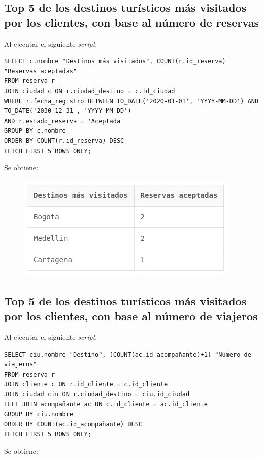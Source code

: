 \documentclass{article}
\begin{document}
\newpage


\subsection{Top 5 de los destinos turísticos más visitados por los clientes, con base al número de reservas}
Al ejecutar el siguiente \textit{script}:
\begin{lstlisting}
SELECT c.nombre "Destinos más visitados", COUNT(r.id_reserva) "Reservas aceptadas"
FROM reserva r
JOIN ciudad c ON r.ciudad_destino = c.id_ciudad
WHERE r.fecha_registro BETWEEN TO_DATE('2020-01-01', 'YYYY-MM-DD') AND TO_DATE('2030-12-31', 'YYYY-MM-DD')
AND r.estado_reserva = 'Aceptada'
GROUP BY c.nombre
ORDER BY COUNT(r.id_reserva) DESC
FETCH FIRST 5 ROWS ONLY;
\end{lstlisting}

Se obtiene:

\begin{figure}[H]
    \centering
    \includegraphics[width=0.75\linewidth]{img/Consulta_3.png}
\end{figure}


\newpage


\subsection{Top 5 de los destinos turísticos más visitados por los clientes, con base al número de viajeros}
Al ejecutar el siguiente \textit{script}:
\begin{lstlisting}
SELECT ciu.nombre "Destino", (COUNT(ac.id_acompañante)+1) "Número de viajeros"
FROM reserva r
JOIN cliente c ON r.id_cliente = c.id_cliente
JOIN ciudad ciu ON r.ciudad_destino = ciu.id_ciudad
LEFT JOIN acompañante ac ON c.id_cliente = ac.id_cliente
GROUP BY ciu.nombre
ORDER BY COUNT(ac.id_acompañante) DESC
FETCH FIRST 5 ROWS ONLY;
\end{lstlisting}

Se obtiene:
\end{document}
